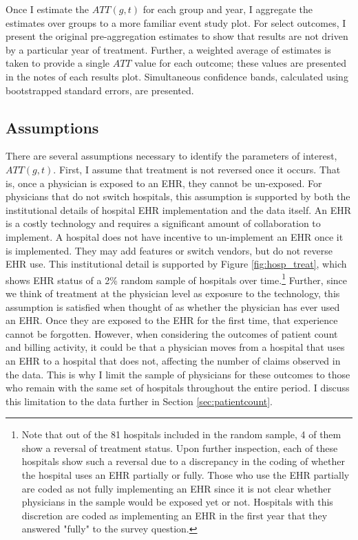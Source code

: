 \documentclass[12pt]{article}
\begin{document}
Once I estimate the $ATT(g,t)$ for each group and year, I aggregate the estimates over groups to a more familiar event study plot. For select outcomes, I present the original pre-aggregation estimates to show that results are not driven by a particular year of treatment.  Further, a weighted average of estimates is taken to provide a single $ATT$ value for each outcome; these values are presented in the notes of each results plot. Simultaneous confidence bands, calculated using bootstrapped standard errors, are presented. 

\subsection{Assumptions}

There are several assumptions necessary to identify the parameters of interest, $ATT(g,t)$. First, I assume that treatment is not reversed once it occurs. That is, once a physician is exposed to an EHR, they cannot be un-exposed. For physicians that do not switch hospitals, this assumption is supported by both the institutional details of hospital EHR implementation and the data itself. An EHR is a costly technology and requires a significant amount of collaboration to implement. A hospital does not have incentive to un-implement an EHR once it is implemented. They may add features or switch vendors, but do not reverse EHR use. This institutional detail is supported by Figure \ref{fig:hosp_treat}, which shows EHR status of a 2\% random sample of hospitals over time.\footnote{Note that out of the 81 hospitals included in the random sample, 4 of them show a reversal of treatment status. Upon further inspection, each of these hospitals show such a reversal due to a discrepancy in the coding of whether the hospital uses an EHR partially or fully. Those who use the EHR partially are coded as not fully implementing an EHR since it is not clear whether physicians in the sample would be exposed yet or not. Hospitals with this discretion are coded as implementing an EHR in the first year that they answered "fully" to the survey question.} Further, since we think of treatment at the physician level as exposure to the technology, this assumption is satisfied when thought of as whether the physician has ever used an EHR. Once they are exposed to the EHR for the first time, that experience cannot be forgotten. However, when considering the outcomes of patient count and billing activity, it could be that a physician moves from a hospital that uses an EHR to a hospital that does not, affecting the number of claims observed in the data. This is why I limit the sample of physicians for these outcomes to those who remain with the same set of hospitals throughout the entire period. I discuss this limitation to the data further in Section \ref{sec:patientcount}.
\end{document}
